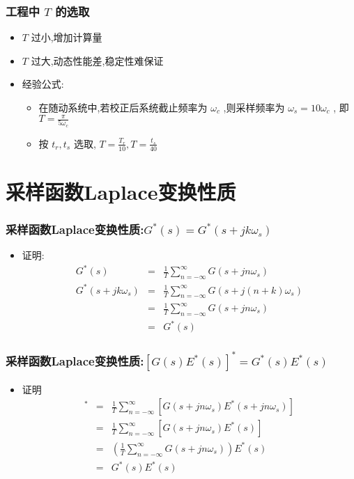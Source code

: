 \documentclass[table]{beamer}
\begin{document}
\begin{frame}
\frametitle{工程中  $T$  的选取}
\label{sec-1-6}

\begin{itemize}
\item <2-> $T$  过小,增加计算量
\item <3-> $T$  过大,动态性能差,稳定性难保证
\item <4->经验公式:
\begin{itemize}
\item <4->在随动系统中,若校正后系统截止频率为  $\omega_c$ ,则采样频率为  $\omega_s=10\omega_c$  , 即  $T=\frac{\pi}{5\omega_c}$
\item <5->按  $t_r,t_s$  选取,   $T=\frac{T_r}{10},T=\frac{t_s}{40}$
\end{itemize}
\end{itemize}
\end{frame}
\section{采样函数Laplace变换性质}
\label{sec-2}
\begin{frame}
\frametitle{采样函数Laplace变换性质:$G^*(s)=G^*(s+jk\omega_s)$}
\label{sec-2-1}

\begin{itemize}
\item <2-> 证明:
     \begin{eqnarray*}
     G^*(s) &=& \frac{1}{T}\sum_{n=-\infty}^{\infty}G(s+jn\omega_s) \\
     G^*(s+jk\omega_s) &=& \frac{1}{T}\sum_{n=-\infty}^{\infty}G(s+j(n+k)\omega_s) \\
      &=& \frac{1}{T}\sum_{n=-\infty}^{\infty}G(s+jn\omega_s)\\
      &=& G^*(s)
     \end{eqnarray*}
\end{itemize}
\end{frame}
\begin{frame}
\frametitle{采样函数Laplace变换性质:$[G(s)E^*(s)]^*=G^*(s)E^*(s)$}
\label{sec-2-2}

\begin{itemize}
\item <2-> 证明
     \begin{eqnarray*}
     [G(s)E^*(s)]^* &= & \frac{1}{T}\sum_{n=-\infty}^{\infty}[G(s+jn\omega_s)E^*(s+jn\omega_s)] \\
      &=& \frac{1}{T}\sum_{n=-\infty}^{\infty}[G(s+jn\omega_s)E^*(s)] \\
      &=& (\frac{1}{T}\sum_{n=-\infty}^{\infty}G(s+jn\omega_s))E^*(s) \\
      &=& G^*(s)E^*(s)
     \end{eqnarray*}
\end{itemize}
\end{frame}
\end{document}

